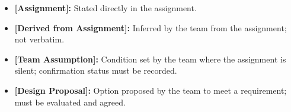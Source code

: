 \par\vspace{4pt}

\begin{itemize}[leftmargin=36pt, itemsep=2pt, topsep=4pt, parsep=2pt]

  \item \textbf{[Assignment]:} Stated directly in the assignment.

  \item \textbf{[Derived from Assignment]:} Inferred by the team from the assignment; not verbatim.

  \item \textbf{[Team Assumption]:} Condition set by the team where the assignment is silent; confirmation status must be recorded.

  \item \textbf{[Design Proposal]:} Option proposed by the team to meet a requirement; must be evaluated and agreed.

\end{itemize}
